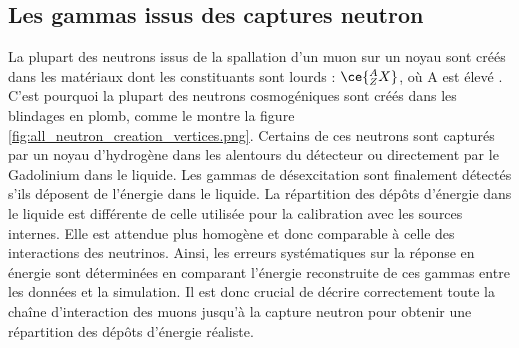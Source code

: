 \bigbreak


\subsection{Les gammas issus des captures neutron}
\label{sec:sim_gamma_from_nX}

La plupart des neutrons issus de la spallation d'un muon sur un noyau sont créés dans les matériaux dont les constituants sont lourds : $\ce{^{A}_{Z}X}$, où A est élevé \cite{Formaggio:2013kya}. C'est pourquoi la plupart des neutrons cosmogéniques sont créés dans les blindages en plomb, comme le montre la figure \ref{fig:all_neutron_creation_vertices.png}. Certains de ces neutrons sont capturés par un noyau d'hydrogène dans les alentours du détecteur ou directement par le Gadolinium dans le liquide. Les gammas de désexcitation sont finalement détectés s'ils déposent de l'énergie dans le liquide. La répartition des dépôts d'énergie dans le liquide est différente de celle utilisée pour la calibration avec les sources internes. Elle est attendue plus homogène et donc comparable à celle des interactions des neutrinos. Ainsi, les erreurs systématiques sur la réponse en énergie sont déterminées en comparant l'énergie reconstruite de ces gammas entre les données et la simulation. Il est donc crucial de décrire correctement toute la chaîne d'interaction des muons jusqu'à la capture neutron pour obtenir une répartition des dépôts d'énergie réaliste.\\

